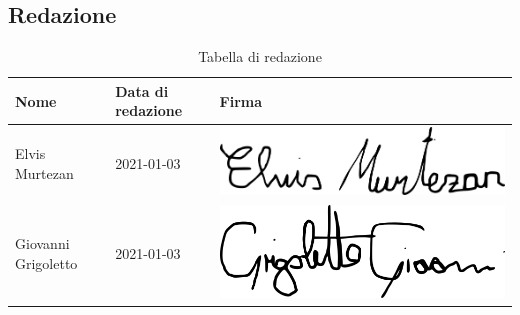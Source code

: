 \subsection{Redazione}
{
	\renewcommand{\arraystretch}{2}
	\begin{longtable}{ C{5cm} C{3.4cm} C{5cm} }
		\caption{Tabella di redazione}\\
		\rowcolor{\primaryColor}
        \textcolor{\secondaryColor}{\textbf{Nome}} & \textcolor{\secondaryColor}{\textbf{Data di redazione}} & \textcolor{\secondaryColor}{\textbf{Firma}}\\ \endhead        		
		{Elvis Murtezan} & 2021-01-03 & \includegraphics[scale=0.20]{./src/Organigramma/immagini/firme/Elvis.png}\\
		{Giovanni Grigoletto} & 2021-01-03 & \includegraphics[scale=0.20]{./src/Organigramma/immagini/firme/giovanni.png}\\
	\end{longtable}
}


